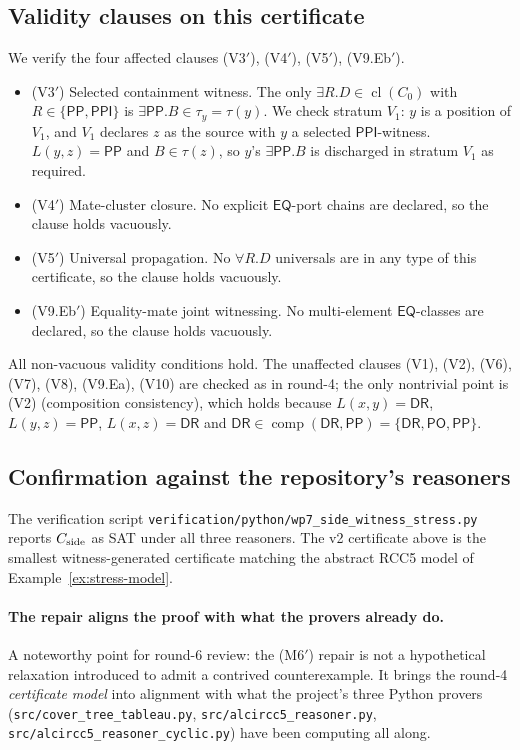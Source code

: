 \documentclass[11pt]{article}
\theoremstyle{definition}
\theoremstyle{remark}
\newcommand{\DR}{\mathsf{DR}}
\newcommand{\PO}{\mathsf{PO}}
\newcommand{\PP}{\mathsf{PP}}
\newcommand{\PPI}{\mathsf{PPI}}
\newcommand{\EQ}{\mathsf{EQ}}
\newcommand{\comp}{\operatorname{comp}}
\newcommand{\Cl}{\operatorname{cl}}
\begin{document}
\subsection{Validity clauses on this certificate}

We verify the four affected clauses (V3$'$), (V4$'$), (V5$'$),
(V9.Eb$'$).
\begin{itemize}
\item (V3$'$) Selected containment witness.  The only
  $\exists R.D\in\Cl(C_0)$ with $R\in\{\PP,\PPI\}$ is
  $\exists\PP.B\in\tau_y=\tau(y)$.  We check stratum $V_1$: $y$ is a
  position of $V_1$, and $V_1$ declares $z$ as the source with $y$ a
  selected $\PPI$-witness.  $L(y,z)=\PP$ and $B\in\tau(z)$, so $y$'s
  $\exists\PP.B$ is discharged in stratum $V_1$ as required.
\item (V4$'$) Mate-cluster closure.  No explicit $\EQ$-port chains
  are declared, so the clause holds vacuously.
\item (V5$'$) Universal propagation.  No $\forall R.D$ universals are
  in any type of this certificate, so the clause holds vacuously.
\item (V9.Eb$'$) Equality-mate joint witnessing.  No multi-element
  $\EQ$-classes are declared, so the clause holds vacuously.
\end{itemize}
All non-vacuous validity conditions hold.  The unaffected clauses
(V1), (V2), (V6), (V7), (V8), (V9.Ea), (V10) are checked as in
round-4; the only nontrivial point is (V2) (composition consistency),
which holds because $L(x,y)=\DR$, $L(y,z)=\PP$, $L(x,z)=\DR$ and
$\DR\in\comp(\DR,\PP)=\{\DR,\PO,\PP\}$.

\subsection{Confirmation against the repository's reasoners}

The verification script
\texttt{verification/python/wp7\_side\_witness\_stress.py} reports
$C_{\rm side}$ as SAT under all three reasoners.  The v2 certificate
above is the smallest witness-generated certificate matching the
abstract RCC5 model of Example~\ref{ex:stress-model}.

\paragraph{The repair aligns the proof with what the provers
already do.}  A noteworthy point for round-6 review: the (M6$'$)
repair is not a hypothetical relaxation introduced to admit a
contrived counterexample.  It brings the round-4 \emph{certificate
model} into alignment with what the project's three Python provers
(\texttt{src/cover\_tree\_tableau.py},
\texttt{src/alcircc5\_reasoner.py},
\texttt{src/alcircc5\_reasoner\_cyclic.py}) have been computing all
along.
\end{document}
